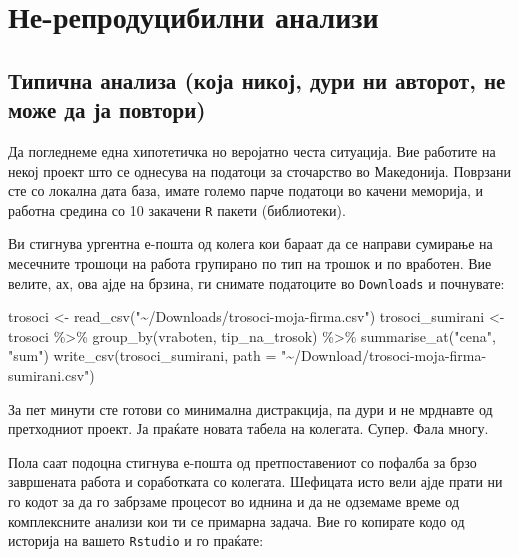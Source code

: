 \documentclass[
]{book}
\newenvironment{Shaded}{\begin{snugshade}}{\end{snugshade}}
\newcommand{\AttributeTok}[1]{\textcolor[rgb]{0.77,0.63,0.00}{#1}}
\newcommand{\FunctionTok}[1]{\textcolor[rgb]{0.00,0.00,0.00}{#1}}
\newcommand{\NormalTok}[1]{#1}
\newcommand{\OtherTok}[1]{\textcolor[rgb]{0.56,0.35,0.01}{#1}}
\newcommand{\SpecialCharTok}[1]{\textcolor[rgb]{0.00,0.00,0.00}{#1}}
\newcommand{\StringTok}[1]{\textcolor[rgb]{0.31,0.60,0.02}{#1}}
\begin{document}
\hypertarget{ux43dux435-ux440ux435ux43fux440ux43eux434ux443ux446ux438ux431ux438ux43bux43dux438-ux430ux43dux430ux43bux438ux437ux438}{%
\chapter{Не-репродуцибилни анализи}\label{ux43dux435-ux440ux435ux43fux440ux43eux434ux443ux446ux438ux431ux438ux43bux43dux438-ux430ux43dux430ux43bux438ux437ux438}}

\hypertarget{typical}{%
\section{Типична анализа (која никој, дури ни авторот, не може да ја повтори)}\label{typical}}

Да погледнеме една хипотетичка но веројатно честа ситуација. Вие работите на некој проект што се однесува на податоци за сточарство во Македонија. Поврзани сте со локална дата база, имате големо парче податоци во качени меморија, и работна средина со 10 закачени \texttt{R} пакети (библиотеки).

Ви стигнува ургентна е-пошта од колега кои бараат да се направи сумирање на месечните трошоци на работа групирано по тип на трошок и по вработен. Вие велите, ах, ова ајде на брзина, ги снимате податоците во \texttt{Downloads} и почнувате:

\begin{Shaded}
\begin{Highlighting}[]
\NormalTok{trosoci }\OtherTok{\textless{}{-}} \FunctionTok{read\_csv}\NormalTok{(}\StringTok{"\textasciitilde{}/Downloads/trosoci{-}moja{-}firma.csv"}\NormalTok{)}
\NormalTok{trosoci\_sumirani }\OtherTok{\textless{}{-}}\NormalTok{ trosoci }\SpecialCharTok{\%\textgreater{}\%} 
  \FunctionTok{group\_by}\NormalTok{(vraboten, tip\_na\_trosok) }\SpecialCharTok{\%\textgreater{}\%} 
  \FunctionTok{summarise\_at}\NormalTok{(}\StringTok{"cena"}\NormalTok{, }\StringTok{"sum"}\NormalTok{)}
\FunctionTok{write\_csv}\NormalTok{(trosoci\_sumirani, }
          \AttributeTok{path =} \StringTok{"\textasciitilde{}/Download/trosoci{-}moja{-}firma{-}sumirani.csv"}\NormalTok{)}
\end{Highlighting}
\end{Shaded}

За пет минути сте готови со минимална дистракција, па дури и не мрднавте од претходниот проект. Ја праќате новата табела на колегата. Супер. Фала многу.

Пола саат подоцна стигнува е-пошта од претпоставениот со пофалба за брзо завршената работа и соработката со колегата. Шефицата исто вели ајде прати ни го кодот за да го забрзаме процесот во иднина и да не одземаме време од комплексните анализи кои ти се примарна задача. Вие го копирате кодо од историја на вашето \texttt{Rstudio} и го праќате:
\end{document}
